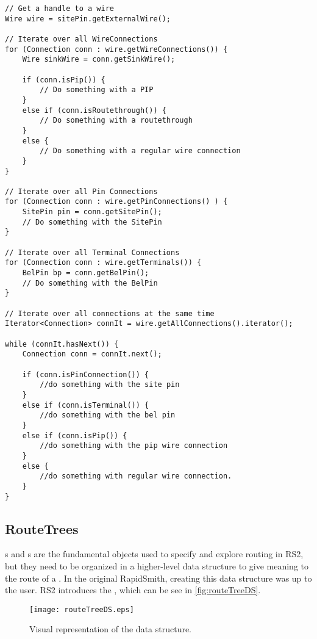 \begin{lstlisting}[caption=How to iterate over Connections in RS2,
label=code:connections] 
// Get a handle to a wire
Wire wire = sitePin.getExternalWire();

// Iterate over all WireConnections
for (Connection conn : wire.getWireConnections()) {
	Wire sinkWire = conn.getSinkWire();

	if (conn.isPip()) {
		// Do something with a PIP
	} 
	else if (conn.isRoutethrough()) {
		// Do something with a routethrough
	} 
	else {	
		// Do something with a regular wire connection				
	}
}

// Iterate over all Pin Connections
for (Connection conn : wire.getPinConnections() ) {
	SitePin pin = conn.getSitePin();
	// Do something with the SitePin
}

// Iterate over all Terminal Connections
for (Connection conn : wire.getTerminals()) {
	BelPin bp = conn.getBelPin();
	// Do something with the BelPin
}

// Iterate over all connections at the same time
Iterator<Connection> connIt = wire.getAllConnections().iterator();

while (connIt.hasNext()) {
	Connection conn = connIt.next();
	
	if (conn.isPinConnection()) {
		//do something with the site pin
	}
	else if (conn.isTerminal()) {
		//do something with the bel pin 
	}
	else if (conn.isPip()) {
		//do something with the pip wire connection
	}
	else {
		//do something with regular wire connection.
	}
}
\end{lstlisting}

\subsection{RouteTrees}

s and s are the fundamental objects used to
specify and explore routing in RS2, but they need to be organized in
a higher-level data structure to give meaning to the route of a .
In the original RapidSmith, creating this data structure was up to the user.
RS2 introduces the , which can be see in
\autoref{fig:routeTreeDS}.

\begin{figure}[H]
\centering
\texttt{[image: routeTreeDS.eps]}
\caption{Visual representation of the  data structure.}
\label{fig:routeTreeDS}
\end{figure}

